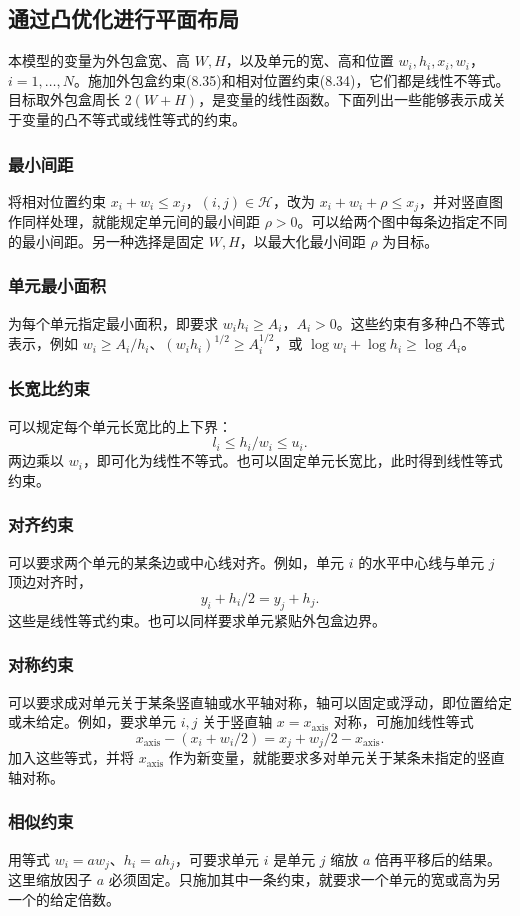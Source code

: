 \subsection{通过凸优化进行平面布局}
本模型的变量为外包盒宽、高 $W,H$，以及单元的宽、高和位置 $w_i,h_i,x_i,w_i$，$i=1,\ldots,N$。施加外包盒约束(8.35)和相对位置约束(8.34)，它们都是线性不等式。目标取外包盒周长 $2(W+H)$，是变量的线性函数。下面列出一些能够表示成关于变量的凸不等式或线性等式的约束。
\subsubsection*{最小间距}
将相对位置约束 $x_i+w_i\leq x_j$，$(i,j)\in\mathcal H$，改为 $x_i+w_i+\rho\leq x_j$，并对竖直图作同样处理，就能规定单元间的最小间距 $\rho>0$。可以给两个图中每条边指定不同的最小间距。另一种选择是固定 $W,H$，以最大化最小间距 $\rho$ 为目标。
\subsubsection*{单元最小面积}
为每个单元指定最小面积，即要求 $w_ih_i\geq A_i$，$A_i>0$。这些约束有多种凸不等式表示，例如 $w_i\geq A_i/h_i$、$(w_ih_i)^{1/2}\geq A_i^{1/2}$，或 $\log w_i+\log h_i\geq\log A_i$。
\subsubsection*{长宽比约束}
可以规定每个单元长宽比的上下界：
\[l_i\leq h_i/w_i\leq u_i.\]
两边乘以 $w_i$，即可化为线性不等式。也可以固定单元长宽比，此时得到线性等式约束。
\subsubsection*{对齐约束}
可以要求两个单元的某条边或中心线对齐。例如，单元 $i$ 的水平中心线与单元 $j$ 顶边对齐时，
\[y_i+h_i/2=y_j+h_j.\]
这些是线性等式约束。也可以同样要求单元紧贴外包盒边界。
\subsubsection*{对称约束}
可以要求成对单元关于某条竖直轴或水平轴对称，轴可以固定或浮动，即位置给定或未给定。例如，要求单元 $i,j$ 关于竖直轴 $x=x_{\mathrm{axis}}$ 对称，可施加线性等式
\[x_{\mathrm{axis}}-(x_i+w_i/2)=x_j+w_j/2-x_{\mathrm{axis}}.\]
加入这些等式，并将 $x_{\mathrm{axis}}$ 作为新变量，就能要求多对单元关于某条未指定的竖直轴对称。
\subsubsection*{相似约束}
用等式 $w_i=aw_j$、$h_i=ah_j$，可要求单元 $i$ 是单元 $j$ 缩放 $a$ 倍再平移后的结果。这里缩放因子 $a$ 必须固定。只施加其中一条约束，就要求一个单元的宽或高为另一个的给定倍数。
